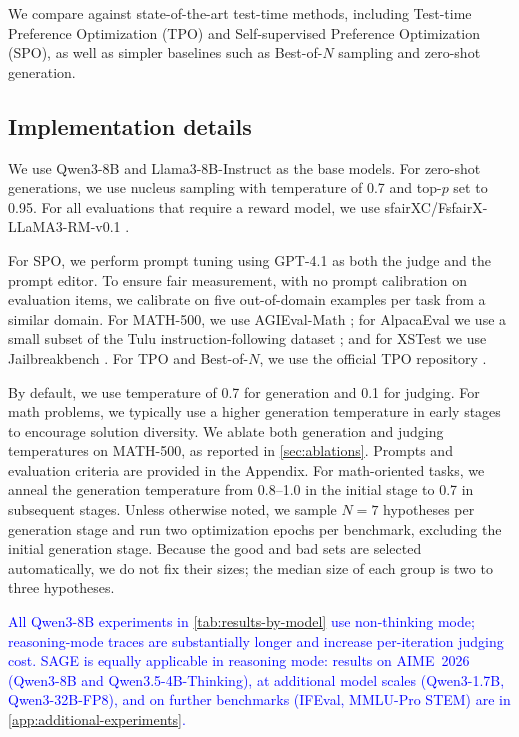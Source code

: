 \documentclass{article}
\theoremstyle{plain}
\theoremstyle{definition}
\theoremstyle{remark}
\newcommand{\method}{SAGE} %
\begin{document}
We compare against state-of-the-art test-time methods, including Test-time Preference Optimization (TPO) and Self-supervised Preference Optimization (SPO), as well as simpler baselines such as Best-of-\(N\) sampling and zero-shot generation.

\subsection{Implementation details}
We use Qwen3-8B and Llama3-8B-Instruct as the base models. For zero-shot generations, we use nucleus sampling with temperature of 0.7 and top-\(p\) set to 0.95.
For all evaluations that require a reward model, we use sfairXC/FsfairX-LLaMA3-RM-v0.1 \citep{dong2024rlhf}.

For SPO, we perform prompt tuning using GPT-4.1 as both the judge and the prompt editor. To ensure fair measurement, with no prompt calibration on evaluation items, we calibrate on five out-of-domain examples per task from a similar domain.
For MATH-500, we use AGIEval-Math \citep{zhongagieval}; for AlpacaEval we use a small subset of the Tulu instruction-following dataset \citet{lambert2024tulu}; and for XSTest we use Jailbreakbench \citet{chao2024jailbreakbench}. For TPO and Best-of-\(N\), we use the official TPO repository \citet{litest}.

By default, we use temperature of 0.7 for generation and 0.1 for judging. For math problems, we typically use a higher generation temperature in early stages to encourage solution diversity. We ablate both generation and judging temperatures on MATH-500, as reported in \cref{sec:ablations}. Prompts and evaluation criteria are provided in the Appendix.
For math-oriented tasks, we anneal the generation temperature from 0.8--1.0 in the initial stage to 0.7 in subsequent stages. Unless otherwise noted, we sample \(N=7\) hypotheses per generation stage and run two optimization epochs per benchmark, excluding the initial generation stage. Because the good and bad sets are selected automatically, we do not fix their sizes; the median size of each group is two to three hypotheses.

\textcolor{blue}{All Qwen3-8B experiments in \cref{tab:results-by-model} use non-thinking mode; reasoning-mode traces are substantially longer and increase per-iteration judging cost. \method{} is equally applicable in reasoning mode: results on AIME~2026 (Qwen3-8B and Qwen3.5-4B-Thinking), at additional model scales (Qwen3-1.7B, Qwen3-32B-FP8), and on further benchmarks (IFEval, MMLU-Pro STEM) are in \cref{app:additional-experiments}.}
\end{document}
